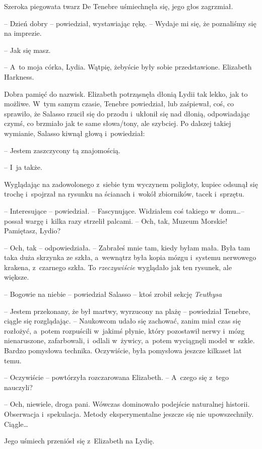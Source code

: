 \documentclass[oneside,polish,12pt,sfheadings]{mwbk}
\begin{document}
Szeroka piegowata twarz De Tenebre uśmiechnęła się, jego głos zagrzmiał.

-- Dzień dobry -- powiedział, wystawiając rękę. -- Wydaje mi się, że
poznaliśmy się na imprezie.

-- Jak się masz.

-- A~to moja córka, Lydia. Wątpię, żebyście były sobie przedstawione.
Elizabeth Harkness.

Dobra pamięć do nazwisk. Elizabeth potrząsnęła dłonią Lydii tak lekko,
jak to możliwe. W~tym samym czasie, Tenebre powiedział, lub zaśpiewał,
coś, co sprawiło, że Salasso rzucił się do przodu i~ukłonił się nad
dłonią, odpowiadając czymś, co brzmiało jak te same słowa/tony, ale
szybciej. Po dalszej takiej wymianie, Salasso kiwnął głową i~powiedział:

-- Jestem zaszczycony tą znajomością.

-- I~ja także.

Wyglądając na zadowolonego z~siebie tym wyczynem poligloty, kupiec
odsunął się trochę i~spojrzał na rysunku na ścianach i~wokół zbiorników,
tacek i~sprzętu.

-- Interesujące -- powiedział. -- Fascynujące. Widziałem coś takiego w~domu\ldots -- possał wargę i~kilka razy strzelił palcami. -- Och, tak, Muzeum
Morskie! Pamiętasz, Lydio?

-- Och, tak -- odpowiedziała. -- Zabrałeś mnie tam, kiedy byłam mała. Była
tam taka duża skrzynka ze szkła, a~wewnątrz była kopia mózgu i~systemu
nerwowego krakena, z~czarnego szkła. To \emph{rzeczywiście} wyglądało
jak ten rysunek, ale większe.

-- Bogowie na niebie -- powiedział Salasso -- ktoś zrobił sekcję
\emph{Teuthysa} 

-- Jestem przekonany, że był martwy, wyrzucony na plażę -- powiedział Tenebre, ciągle się rozglądając. -- Naukowcom udało się
zachować, zanim miał czas się rozłożyć, a~potem rozpuścili w~jakimś
płynie, który pozostawił nerwy i~mózg nienaruszone, zafarbowali, i~odlali w~żywicy, a~potem wyciągnęli model w~szkle. Bardzo pomysłowa
technika. Oczywiście, była pomysłowa jeszcze kilkaset lat temu.

-- Oczywiście -- powtórzyła rozczarowana Elizabeth. -- A~czego się z~tego
nauczyli?

-- Och, niewiele, droga pani. Wówczas dominowało podejście naturalnej
historii. Obserwacja i~spekulacja. Metody eksperymentalne jeszcze się
nie upowszechniły. Ciągle\ldots

Jego uśmiech przeniósł się z~Elizabeth na Lydię. 
\end{document}
